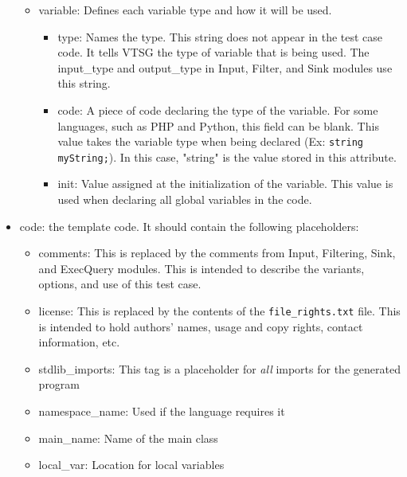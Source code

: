 \documentclass[12pt]{article}
\begin{document}
\begin{itemize}
\begin{itemize}
        \item variable: Defines each variable type and how it will 
        be used.
        \begin{itemize}
        \item type: Names the type. This string 
        does not appear in the test case code.  It tells VTSG
        the type of variable that is being used.  The input\_type
        and output\_type in Input, Filter, and Sink modules use
        this string.

        \item code: A piece of code declaring the type of the variable. For 
        some languages, such as PHP and Python, this field can be blank. 
        This value takes the variable type when being declared 
        (Ex: \verb|string myString;|). In this case, "string" is the 
        value stored in this attribute.

        \item init: Value assigned at the initialization of the variable. 
        This value is used when declaring all global variables in the code.
        \end{itemize}
    \end{itemize}
    
    \item code: the template code. It should contain the 
    following placeholders:
    \begin{itemize}
        \item comments: This is replaced by the comments from Input,
        Filtering, Sink, and ExecQuery modules. This is intended to
        describe the variants, options, and use of this test case. 
        
        \item license: This is replaced by the contents of the
        \verb|file_rights.txt| file.  This is intended to hold
        authors' names, usage and copy rights, contact information, 
        etc.
        
        \item stdlib\_imports:  This tag is a placeholder for 
        \emph{all} imports for the generated program

        \item namespace\_name:  Used if the language requires it

        \item main\_name:  Name of the main class

        \item local\_var:  Location for local variables


\end{itemize}
\end{itemize}
\end{document}
